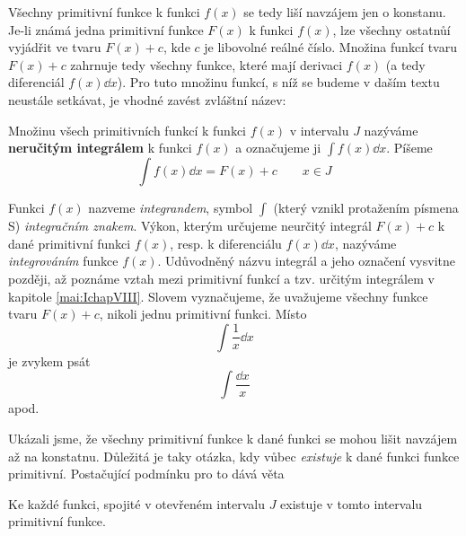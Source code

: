     Všechny primitivní funkce k funkci \(f(x)\) se tedy liší navzájem jen o konstanu. Je-li známá
    jedna primitivní funkce \(F(x)\) k funkci \(f(x)\), lze všechny ostatnůí vyjádřit ve tvaru
    \(F(x) + c\), kde \(c\) je libovolné reálné číslo. Množina funkcí tvaru \(F(x) + c\) zahrnuje
    tedy všechny funkce, které mají derivaci \(f(x)\) (a tedy diferenciál \(f(x)\dd{x}\)). Pro tuto
    množinu funkcí, s níž se budeme v daším textu neustále setkávat, je vhodné zavést zvláštní
    název:  

    \begin{mdframed}[style=mdmathdef] 
      \begin{definition}\label{mai:def004}
        Množinu všech primitivních funkcí k funkci \(f(x)\) v intervalu \(J\) nazýváme
        \textbf{neručitým integrálem} k funkci \(f(x)\)  a označujeme ji \(\int f(x)\dd{x}\). Píšeme 
        \begin{equation*}
          \boxed{\int f(x)\dd{x} = F(x) + c \qquad x\in J}
        \end{equation*}
      \end{definition}
    \end{mdframed}

    Funkci \(f(x)\) nazveme \emph{integrandem}, symbol \(\int\) (který vznikl protažením písmena S)
    \emph{integračním znakem}. Výkon, kterým určujeme neurčitý integrál \(F(x) + c\) k dané
    primitivní funkci \(f(x)\), resp. k diferenciálu \(f(x)\dd{x}\), nazýváme \emph{integrováním}
    funkce \(f(x)\). Udůvodněný názvu integrál a jeho označení vysvitne později, až poznáme vztah
    mezi primitivní funkcí a tzv. určitým integrálem v kapitole \ref{mai:IchapVIII}. Slovem
     vyznačujeme, že uvažujeme všechny funkce tvaru \(F(x)+ c\), nikoli jednu
    primitivní funkci. Místo \[\int\dfrac{1}{x}\dd{x}\] je zvykem psát \[\int\dfrac{\dd{x}}{x}\]
    apod. 

    Ukázali jsme, že všechny primitivní funkce k dané funkci se mohou lišit navzájem až na
    konstatnu. Důležitá je taky otázka, kdy vůbec \emph{existuje} k dané funkci funkce primitivní.
    Postačující podmínku pro to dává věta 
    
    \begin{mdframed}[style=mdmathlemma] 
      \begin{lemma}\label{mai:lemma011}
        Ke každé funkci, spojité v otevřeném intervalu \(J\) existuje v tomto intervalu primitivní
        funkce. 
      \end{lemma}
    \end{mdframed}

